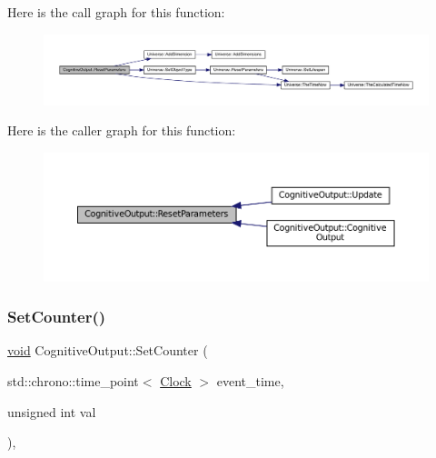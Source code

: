 Here is the call graph for this function\+:\nopagebreak
\begin{figure}[H]
\begin{center}
\leavevmode
\includegraphics[width=350pt]{class_cognitive_output_ab43b79aaadf75d18512c4379a77542cd_cgraph}
\end{center}
\end{figure}
Here is the caller graph for this function\+:\nopagebreak
\begin{figure}[H]
\begin{center}
\leavevmode
\includegraphics[width=350pt]{class_cognitive_output_ab43b79aaadf75d18512c4379a77542cd_icgraph}
\end{center}
\end{figure}
\mbox{\label{class_cognitive_output_a087e8bdab9eb6020dbbe6d47f524c8b6}} 
\subsubsection{\texorpdfstring{Set\+Counter()}{SetCounter()}}
{\footnotesize\ttfamily \mbox{\hyperlink{glad_8h_a950fc91edb4504f62f1c577bf4727c29}{void}} Cognitive\+Output\+::\+Set\+Counter (\begin{DoxyParamCaption}\item[{std\+::chrono\+::time\+\_\+point$<$ \mbox{\hyperlink{universe_8h_a0ef8d951d1ca5ab3cfaf7ab4c7a6fd80}{Clock}} $>$}]{event\+\_\+time,  }\item[{unsigned int}]{val }\end{DoxyParamCaption})\hspace{0.3cm}{\ttfamily [inline]}, {\ttfamily [virtual]}}



